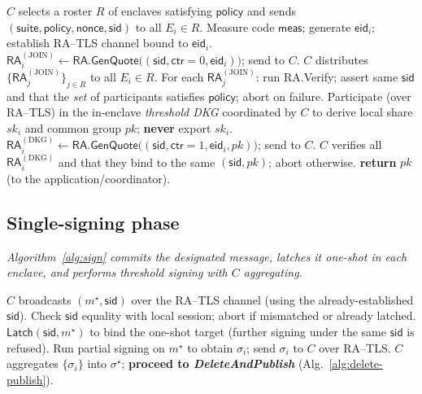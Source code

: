 \documentclass[runningheads,orivec]{llncs}
\newcommand{\prot}{\textsf{QuanTEEum}}
\begin{document}
\begin{algorithm}[H]
\caption{\prot{}: \emph{SetupAndDKG}}
\label{alg:setup}
\begin{small}
\begin{algorithmic}[1]
\State $C$ selects a roster $R$ of enclaves satisfying $\mathsf{policy}$ and sends $(\mathsf{suite},\mathsf{policy},\mathsf{nonce},\mathsf{sid})$ to all $E_i\in R$.
  \State Measure code $\mathsf{meas}$; generate $\mathsf{eid}_i$; establish RA--TLS channel bound to $\mathsf{eid}_i$.
  \State $\mathsf{RA}^{(\mathrm{JOIN})}_i \gets \textsf{RA.GenQuote}\big((\mathsf{sid},\mathsf{ctr}{=}0,\mathsf{eid}_i)\big)$; send to $C$.
\EndFor
\State $C$ distributes $\{\mathsf{RA}^{(\mathrm{JOIN})}_j\}_{j\in R}$ to all $E_i\in R$.
  \State For each $\mathsf{RA}^{(\mathrm{JOIN})}_j$: run \textsf{RA.Verify}; assert same $\mathsf{sid}$ and that the \emph{set} of participants satisfies $\mathsf{policy}$; abort on failure.
  \State Participate (over RA--TLS) in the in\mbox{-}enclave \emph{threshold DKG} coordinated by $C$ to derive local share $sk_i$ and common group $pk$; \textbf{never} export $sk_i$.
  \State $\mathsf{RA}^{(\mathrm{DKG})}_i \gets \textsf{RA.GenQuote}\big((\mathsf{sid},\mathsf{ctr}{=}1,\mathsf{eid}_i,pk)\big)$; send to $C$.
\EndFor
\State $C$ verifies all $\mathsf{RA}^{(\mathrm{DKG})}_i$ and that they bind to the same $(\mathsf{sid},pk)$; abort otherwise.
\State \textbf{return} $pk$ (to the application/coordinator).
\end{algorithmic}
\end{small}
\end{algorithm}

\FloatBarrier

\subsection{Single-signing phase}
\emph{Algorithm~\ref{alg:sign} commits the designated message, latches it one-shot in each enclave, and performs threshold signing with $C$ aggregating.}

\begin{algorithm}[H]
\caption{\prot{}: \emph{SingleSign} on designated message $m^{\star}$}
\label{alg:sign}
\begin{small}
\begin{algorithmic}[1]
\State $C$ broadcasts $(m^{\star},\mathsf{sid})$ over the RA--TLS channel (using the already-established $\mathsf{sid}$).
  \State Check $\mathsf{sid}$ equality with local session; abort if mismatched or already latched.
  \State $\textsf{Latch}(\mathsf{sid},m^{\star})$ to bind the one-shot target (further signing under the same $\mathsf{sid}$ is refused).
  \State Run partial signing on $m^{\star}$ to obtain $\sigma_i$; send $\sigma_i$ to $C$ over RA--TLS.
\EndFor
\State $C$ aggregates $\{\sigma_i\}$ into $\sigma^{\star}$; \textbf{proceed to \emph{DeleteAndPublish}} (Alg.~\ref{alg:delete-publish}).
\end{algorithmic}
\end{small}
\end{algorithm}
\end{document}
